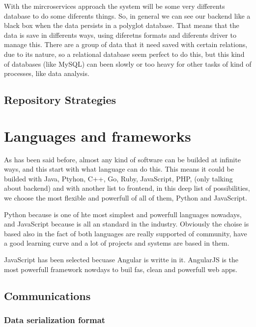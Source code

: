 With the mircroservices approach the system will be some very differents
database to do some diferents things. So, in general we can see our
backend like a black box when the data persists in a polyglot database.
That means that the data is save in differents ways, using diferetns
formats and diferents driver to manage this. There are a group of
data that it need saved with certain relations, due to its nature,
so a relational database seem perfect to do this, but this kind of
databases (like MySQL) can been slowly or too heavy for other tasks
of kind of processes, like data analysis.

\subsection{Repository Strategies}



\section{Languages and frameworks}

As has been said before, almost any kind of software can be builded at infinite
ways, and this start with what language can do this. This means it could be
builded with Java, Ptyhon, C++, Go, Ruby, JavaScript, PHP,  (only talking about
backend) and with another list to frontend, in this deep list of possibilities,
we choose the most flexible and powerfull of all of them, Python and JavaScript.

Python because is one of hte most simplest and powerfull languages nowadays, and
JavaScript because is all an standard in the industry. Obviously the choise is
based also in the fact of both languages are really supported of community, have a
good learning curve and a lot of projects and systems are based in them.

JavaScript has been selected becuase Angular is writte in it. AngularJS is the
most powerfull framework nowdays to buil fas, clean and powerfull web apps.


\subsection{Communications}

\subsubsection{Data serialization format}


